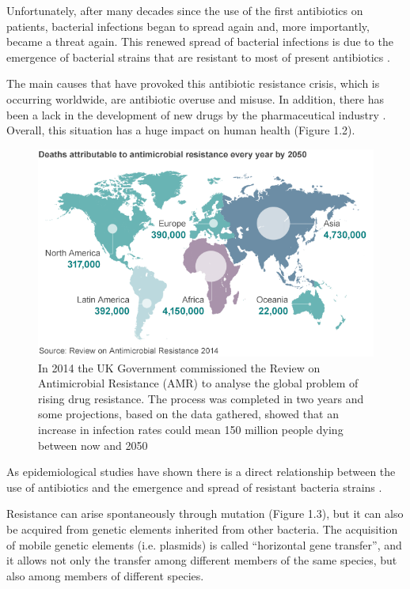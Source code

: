 \documentclass[11pt]{report}
\begin{document}
Unfortunately, after many decades since the use of the first antibiotics on patients, bacterial infections began to spread again and, more importantly, became a threat again.
This renewed spread of bacterial infections is due to the emergence of bacterial strains that are resistant to most of present antibiotics \cite{ventola2015antibiotic}.

The main causes that have provoked this antibiotic resistance crisis, which is occurring worldwide, are antibiotic overuse and misuse.
In addition, there has been a lack in the development of new drugs by the pharmaceutical industry \cite{nature2013}.
Overall, this situation has a huge impact on human health (Figure 1.2).

\begin{figure}[htp]
\centering
\includegraphics[scale=0.80]{img/Antimicrobial_Spread2050.png}
\caption{In 2014 the UK Government commissioned the Review on Antimicrobial Resistance (AMR) to analyse the global problem of rising drug resistance. The process was completed in two years and some projections, based on the data gathered, showed that an increase in infection rates could mean 150 million people dying between now and 2050 \cite{review2014antimicrobial}}
\label{}
\end{figure}

As epidemiological studies have shown there is a direct relationship between the use of antibiotics and the emergence and spread of resistant bacteria strains \cite{huttner2013antimicrobial}.

Resistance can arise spontaneously through mutation (Figure 1.3), but it can also be acquired from genetic elements inherited from other bacteria.
The acquisition of mobile genetic elements (i.e. plasmids) is called “horizontal gene transfer”, and it allows not only the transfer among different members of the same species, but also among members of different species.
\end{document}
